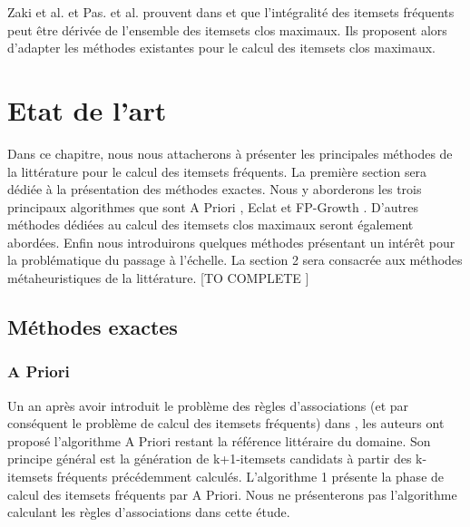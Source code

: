\documentclass[a4paper,10pt]{report}
\begin{document}
Zaki et al. et Pas. et al. prouvent dans \cite{ZAK99} et \cite{PAS99} que l'intégralité des itemsets fréquents peut être dérivée de l'ensemble des itemsets clos maximaux. Ils proposent alors d'adapter les méthodes existantes pour le calcul des itemsets clos maximaux. \\

\chapter{Etat de l'art}
\hspace{0.15cm}Dans ce chapitre, nous nous attacherons à présenter les principales méthodes de la littérature pour le calcul des itemsets fréquents. La première section sera dédiée à la présentation des méthodes exactes. Nous y aborderons les trois principaux algorithmes que sont A Priori \cite{AGR94}, Eclat \cite{ZAK00} et FP-Growth \cite{HAN04}. D'autres méthodes dédiées au calcul des itemsets clos maximaux seront également abordées. Enfin nous introduirons quelques méthodes présentant un intérêt pour la problématique du passage à l'échelle. La section 2 sera consacrée aux méthodes métaheuristiques de la littérature. [TO COMPLETE ] \\

\section{ Méthodes exactes}

\subsection{A Priori}

\hspace{0.15cm}Un an après avoir introduit le problème des règles d'associations (et par conséquent le problème de calcul des itemsets fréquents) dans \cite{AGR93}, les auteurs ont proposé l'algorithme A Priori \cite{AGR94} restant la référence littéraire du domaine. Son principe général est la génération de k+1-itemsets candidats à partir des k-itemsets fréquents précédemment calculés. L'algorithme 1 présente la phase de calcul des itemsets fréquents par A Priori. Nous ne présenterons pas l'algorithme calculant les règles d'associations dans cette étude. \\ 
\end{document}
